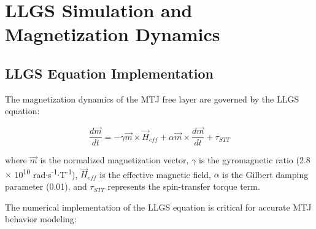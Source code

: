 \documentclass[conference]{IEEEtran}
\begin{document}
\section{LLGS Simulation and Magnetization Dynamics}

\subsection{LLGS Equation Implementation}

The magnetization dynamics of the MTJ free layer are governed by the LLGS equation:

\begin{equation}
\frac{d\vec{m}}{dt} = -\gamma \vec{m} \times \vec{H}_{eff} + \alpha \vec{m} \times \frac{d\vec{m}}{dt} + \tau_{STT}
\label{eq:llgs}
\end{equation}

where $\vec{m}$ is the normalized magnetization vector, $\gamma$ is the gyromagnetic ratio (2.8 $\times$ 10\textsuperscript{10} rad$\cdot$s\textsuperscript{-1}$\cdot$T\textsuperscript{-1}), $\vec{H}_{eff}$ is the effective magnetic field, $\alpha$ is the Gilbert damping parameter (0.01), and $\tau_{STT}$ represents the spin-transfer torque term.

The numerical implementation of the LLGS equation is critical for accurate MTJ behavior modeling:
\end{document}
